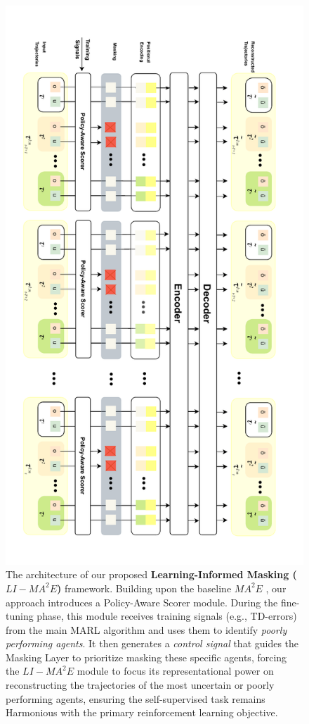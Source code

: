\begin{description}
\begin{figure}[H]
    \includegraphics[angle=90, width=0.99\linewidth]{img_pfe/li-mae_this.pdf}
  \caption{The architecture of our proposed \textbf{Learning-Informed Masking ($LI-{MA}^2E$)} framework. Building upon the baseline ${MA}^2E$ , our approach introduces a Policy-Aware Scorer module. During the fine-tuning phase, this module receives training signals (e.g., TD-errors) from the main MARL algorithm and uses them to identify \textit{poorly performing agents}. It then generates a \textit{control signal} that guides the Masking Layer to prioritize masking these specific agents,  forcing the  $LI-{MA}^2E$ module to focus its representational power on reconstructing the trajectories of the most uncertain or poorly performing agents, ensuring the self-supervised task remains Harmonious with the primary reinforcement learning objective.}
    \label{fig:ma2e_architecture}
\end{figure}

\end{description}

